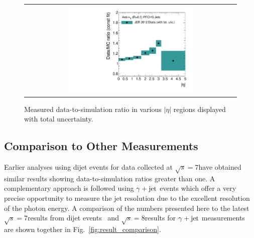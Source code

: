 \begin{figure}[!hp]
  \centering
  \begin{tabular}{c}
                \includegraphics[width=0.6\textwidth]{figures/JER_2012_final_combination_v1.pdf}
  \end{tabular}
  \caption{Measured data-to-simulation ratio in various $|\eta|$ regions displayed with total uncertainty.}
  \label{fig:result_2012}
\end{figure}
 
\subsection{Comparison to Other Measurements}
\label{subsec:jer_results_comparison}
Earlier analyses using dijet events for data collected at $\sqrt{s}=7$\tev have obtained similar results showing data-to-simulation ratios greater than one. A complementary approach is followed using $\gamma +\rm{jet}$ events which offer a very precise opportunity to measure the jet resolution due to the excellent resolution of the photon energy. A comparison of the numbers presented here to the latest $\sqrt{s}=7$\tev results from dijet events~\cite{thesis:Schroeder} and $\sqrt{s}=8$\tev results for $\gamma +\rm{jet}$ measurements~\cite{CMS-AN-2013-179} are shown together in Fig.~\ref{fig:result_comparison}.

